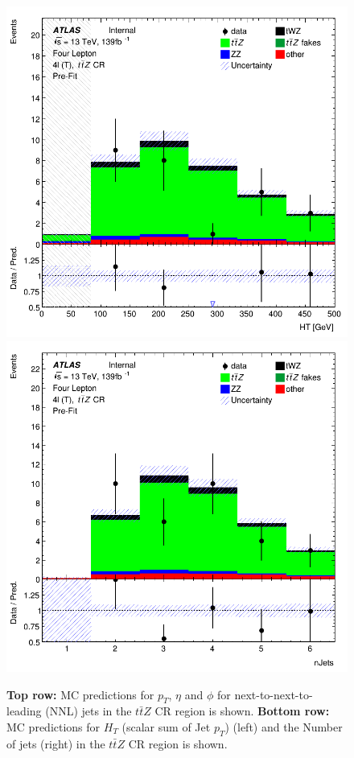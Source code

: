 \begin{figure}[htbp]
    \includegraphics[width=.3\textwidth]{figures/PreFitPlots/lep4_ttZ_4T_HT.png}   \quad
    \includegraphics[width=.3\textwidth]{figures/PreFitPlots/lep4_ttZ_4T_Num_Jets.png}

    \caption{\textbf{Top row:} MC predictions for $p_{T}$, $\eta$ and $\phi$ for next-to-next-to-leading (NNL) jets in the $t\bar{t}Z$ CR region  is shown. \textbf{Bottom row:} MC predictions for $H_{T}$ (scalar sum of Jet $p_{T}$) (left) and the Number of jets (right) in the $t\bar{t}Z$ CR region  is shown.}
    \label{fig:4lep-ttZ-CR-NNLjetPlots} 
\end{figure}



